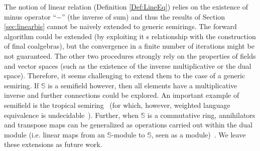 \documentclass[3p]{elsarticle}
\newcommand{\fL}{\mathcal{L}}    %
\newcommand{\K}{\mathbb{K}}            %
\newcommand{\SR}{\mathbb{S}}            %
\begin{document}
The notion of linear relation (Definition \ref{Def:LineEq}) relies on the existence of minus operator ``$-$'' (the inverse of sum)
and thus the results of Section \ref{sec:linearbis} cannot be naively extended to generic semirings.
%
%
%
%
The forward algorithm
could be extended (by exploiting it s relationship with the construction of final coalgebras), %
but the convergence in a finite number of iterations might be not guaranteed.
The other two procedures strongly rely on the properties of fields and vector spaces (such
as the existence of the inverse multiplicative or the dual space). Therefore, it seems challenging to
extend them to the case of a generic semiring.  If $\SR$ is a semifield however, then all elements have a
multiplicative inverse and further connections could be explored. An important example of semifield is the tropical
semiring~\cite{HW96} (for which, however, weighted language equivalence is undecidable~\cite{Krob}). Further, when $\SR$ is a commutative ring, annihilators and transpose maps
can be generalized as operations carried out within the dual module (i.e. linear maps from an
$\SR$-module to $\SR$, seen as a module)~\cite{Rot02}. We leave these extensions as future work.

%
%
\end{document}
